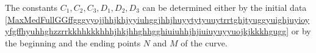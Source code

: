 \documentclass{article}
\theoremstyle{definition}
\theoremstyle{remark}
\newcommand{\er}{\eqref}
\newcommand{\er}{\eqref}
\begin{document}
%
%
%
The constants $C_1,C_2,C_3,D_1,D_2,D_3$ can be determined either by
the initial data
\er{MaxMedFullGGffgggyyojjhhjkhjyyiuhggjhhjhuyytytyuuytrrtghjtyuggyuighjuyioyyfgffhyuhhghzzrrkkhhkkkhhhjhkjhhghhgghiuiuhhjhjiuiuyuyyuojkjkkkhgugg}
or by the beginning and the ending points $N$ and $M$ of the curve.
%
%
%
%
\begin{comment}
Consider the coordinates of the endpoints of the curve as
$N=(N_1,N_2,N_3)$ and $M=(M_1,M_2,M_3)$. Then for $\lambda=0$ we
must have $(x,y,z)=N$ i.e.
\begin{equation}\label{MaxMedFullGGffgggyyojjhhjkhjyyiuhggjhhjhuyytytyuuytrrtghjtyuggyuighjuyioyyfgffhyuhhghzzrrkkhhkkkhhhjhkjhhghhgghiuiuhhjhjiuiuyuyyuojkjkkkh}
\begin{cases}
D_1=N_1\\
D_2=N_2,\\
D_3=N_3.
\end{cases}
\end{equation}
Moreover we must have
\er{MaxMedFullGGffgggyyojjhhjkhjyyiuhggjhhjhuyytytyuuytrrtghjtyuggyuighjuyioyyfgffhyuhhghzzrrkkhhkkkhhhjhkjhhghhgghiuiuhhjhjiuiuyuyyuojk}.
Finally there must exist $\lambda_0>0$, which turns to be the length
of the curve, such that
\begin{equation}\label{MaxMedFullGGffgggyyojjhhjkhjyyiuhggjhhjhuyytytyuuytrrtghjtyuggyuighjuyioyyfgffhyuhhghzzrrkkhhkkkhhhjhkjhhghhgghiuiuhhjhjiuiuyuyyukklghhghyhjhjh}
\begin{cases}
M_1=C_1\frac{c}{2w}\sqrt{\frac{\kappa_0}{\gamma_0}}\left(\cos{\left(\frac{2w}{c}\sqrt{\frac{\gamma_0}{\kappa_0}}\lambda_0\right)}-1\right)+C_2\frac{c}{2w}\sqrt{\frac{\kappa_0}{\gamma_0}}\sin{\left(\frac{2w}{c}\sqrt{\frac{\gamma_0}{\kappa_0}}\lambda_0\right)}+D_1
\\
M_2=-C_1\frac{c}{2w}\sqrt{\frac{\kappa_0}{\gamma_0}}\sin{\left(\frac{2w}{c}\sqrt{\frac{\gamma_0}{\kappa_0}}\lambda_0\right)}+C_2\frac{c}{2w}\sqrt{\frac{\kappa_0}{\gamma_0}}\left(\cos{\left(\frac{2w}{c}\sqrt{\frac{\gamma_0}{\kappa_0}}\lambda_0\right)}-1\right)+D_2
\\
M_3=C_3\lambda_0+D_3.
\end{cases}
\end{equation}
\end{comment}
%
%
%
%
%
%
%
%
%
\end{document}
